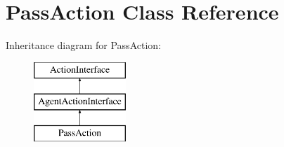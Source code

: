 \hypertarget{class_pass_action}{\section{Pass\-Action Class Reference}
\label{class_pass_action}
}
Inheritance diagram for Pass\-Action\-:\begin{figure}[H]
\begin{center}
\leavevmode
\includegraphics[height=3.000000cm]{class_pass_action}
\end{center}
\end{figure}
